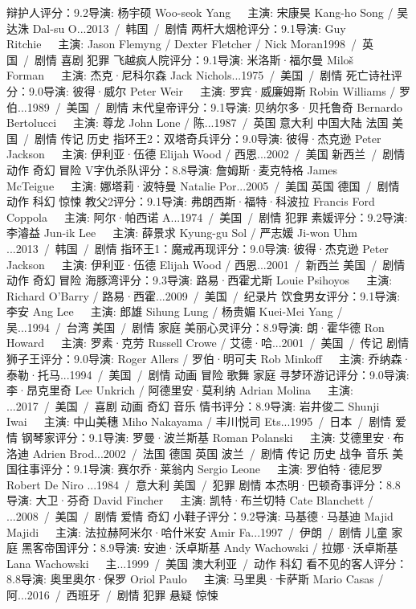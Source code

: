 辩护人评分：9.2导演: 杨宇硕 Woo-seok Yang   主演: 宋康昊 Kang-ho Song / 吴达洙 Dal-su O...2013 / 韩国 / 剧情
两杆大烟枪评分：9.1导演: Guy Ritchie   主演: Jason Flemyng / Dexter Fletcher / Nick Moran1998 / 英国 / 剧情 喜剧 犯罪
飞越疯人院评分：9.1导演: 米洛斯·福尔曼 Miloš Forman   主演: 杰克·尼科尔森 Jack Nichols...1975 / 美国 / 剧情
死亡诗社评分：9.0导演: 彼得·威尔 Peter Weir   主演: 罗宾·威廉姆斯 Robin Williams / 罗伯...1989 / 美国 / 剧情
末代皇帝评分：9.1导演: 贝纳尔多·贝托鲁奇 Bernardo Bertolucci   主演: 尊龙 John Lone / 陈...1987 / 英国 意大利 中国大陆 法国 美国 / 剧情 传记 历史
指环王2：双塔奇兵评分：9.0导演: 彼得·杰克逊 Peter Jackson   主演: 伊利亚·伍德 Elijah Wood / 西恩...2002 / 美国 新西兰 / 剧情 动作 奇幻 冒险
V字仇杀队评分：8.8导演: 詹姆斯·麦克特格 James McTeigue   主演: 娜塔莉·波特曼 Natalie Por...2005 / 美国 英国 德国 / 剧情 动作 科幻 惊悚
教父2评分：9.1导演: 弗朗西斯·福特·科波拉 Francis Ford Coppola   主演: 阿尔·帕西诺 A...1974 / 美国 / 剧情 犯罪
素媛评分：9.2导演: 李濬益 Jun-ik Lee   主演: 薛景求 Kyung-gu Sol / 严志媛 Ji-won Uhm ...2013 / 韩国 / 剧情
指环王1：魔戒再现评分：9.0导演: 彼得·杰克逊 Peter Jackson   主演: 伊利亚·伍德 Elijah Wood / 西恩...2001 / 新西兰 美国 / 剧情 动作 奇幻 冒险
海豚湾评分：9.3导演: 路易·西霍尤斯 Louie Psihoyos   主演: Richard O'Barry / 路易·西霍...2009 / 美国 / 纪录片
饮食男女评分：9.1导演: 李安 Ang Lee   主演: 郎雄 Sihung Lung / 杨贵媚 Kuei-Mei Yang / 吴...1994 / 台湾 美国 / 剧情 家庭
美丽心灵评分：8.9导演: 朗·霍华德 Ron Howard   主演: 罗素·克劳 Russell Crowe / 艾德·哈...2001 / 美国 / 传记 剧情
狮子王评分：9.0导演: Roger Allers / 罗伯·明可夫 Rob Minkoff   主演: 乔纳森·泰勒·托马...1994 / 美国 / 剧情 动画 冒险 歌舞 家庭
寻梦环游记评分：9.0导演: 李·昂克里奇 Lee Unkrich / 阿德里安·莫利纳 Adrian Molina   主演: ...2017 / 美国 / 喜剧 动画 奇幻 音乐
情书评分：8.9导演: 岩井俊二 Shunji Iwai   主演: 中山美穗 Miho Nakayama / 丰川悦司 Ets...1995 / 日本 / 剧情 爱情
钢琴家评分：9.1导演: 罗曼·波兰斯基 Roman Polanski   主演: 艾德里安·布洛迪 Adrien Brod...2002 / 法国 德国 英国 波兰 / 剧情 传记 历史 战争 音乐
美国往事评分：9.1导演: 赛尔乔·莱翁内 Sergio Leone   主演: 罗伯特·德尼罗 Robert De Niro ...1984 / 意大利 美国 / 犯罪 剧情
本杰明·巴顿奇事评分：8.8导演: 大卫·芬奇 David Fincher   主演: 凯特·布兰切特 Cate Blanchett / ...2008 / 美国 / 剧情 爱情 奇幻
小鞋子评分：9.2导演: 马基德·马基迪 Majid Majidi   主演: 法拉赫阿米尔·哈什米安 Amir Fa...1997 / 伊朗 / 剧情 儿童 家庭
黑客帝国评分：8.9导演: 安迪·沃卓斯基 Andy Wachowski / 拉娜·沃卓斯基 Lana Wachowski   主...1999 / 美国 澳大利亚 / 动作 科幻
看不见的客人评分：8.8导演: 奥里奥尔·保罗 Oriol Paulo   主演: 马里奥·卡萨斯 Mario Casas / 阿...2016 / 西班牙 / 剧情 犯罪 悬疑 惊悚
